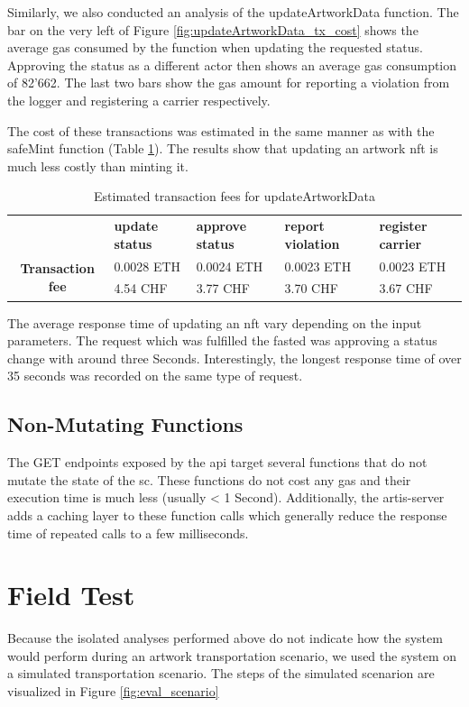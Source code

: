 Similarly, we also conducted an analysis of the updateArtworkData function. The bar on the very left of Figure \ref{fig:updateArtworkData_tx_cost} shows the average gas consumed by the function when updating the requested status. Approving the status as a different actor then shows an average gas consumption of 82'662. The last two bars show the gas amount for reporting a violation from the logger and registering a carrier respectively.

The cost of these transactions was estimated in the same manner as with the safeMint function (Table \ref{tab:updateArtworkData_tx_fees}). The results show that updating an artwork \gls{nft} is much less costly than minting it. 

\begin{table}[ht]
\begin{tabular}{cllll}
                                          & \textbf{update status} & \textbf{approve status} & \textbf{report violation} & \textbf{register carrier} \\ \cline{2-5} 
\multirow{2}{*}{\textbf{Transaction fee}} & 0.0028 ETH             & 0.0024 ETH          & 0.0023 ETH        & 0.0023 ETH       \\
                                          & 4.54 CHF               & 3.77 CHF            & 3.70 CHF          & 3.67 CHF       
\end{tabular}
\caption{Estimated transaction fees for updateArtworkData}
\label{tab:updateArtworkData_tx_fees}
\end{table}

The average response time of updating an \gls{nft} vary depending on the input parameters. The request which was fulfilled the fasted was approving a status change with around three Seconds. Interestingly, the longest response time of over 35 seconds was recorded on the same type of request.


\subsection*{Non-Mutating Functions}
The GET endpoints exposed by the \gls{api} target several functions that do not mutate the state of the \gls{sc}. These functions do not cost any gas and their execution time is much less (usually < 1 Second). Additionally, the artis-server adds a caching layer to these function calls which generally reduce the response time of repeated calls to a few milliseconds. 

\section{Field Test}
\label{sec:field_test}
Because the isolated analyses performed above do not indicate how the system would perform during an artwork transportation scenario, we used the system on a simulated transportation scenario. The steps of the simulated scenarion are visualized in Figure \ref{fig:eval_scenario}


